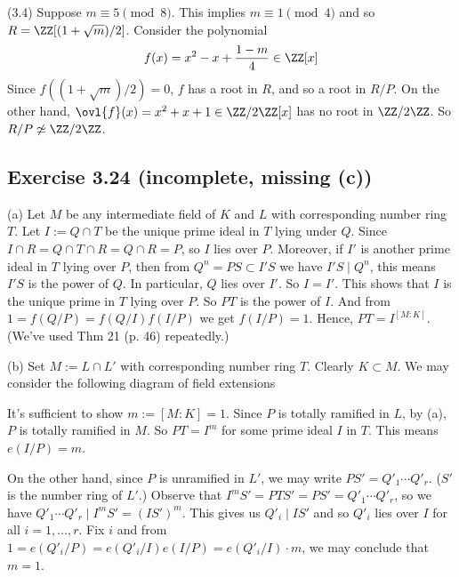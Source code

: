 \documentclass[../Chapter.tex]{subfiles}
\begin{document}
(3.4) Suppose $m\equiv 5\pmod{8}$. This implies $m\equiv 1\pmod{4}$ and so $R=\ZZ[{(1+\sqrt{m})/2}]$. Consider the polynomial $$f(x)=x^2-x+\frac{1-m}{4}\in\ZZ[x]$$ Since $f((1+\sqrt{m})/2)=0$, $f$ has a root in $R$, and so a root in $R/P$. On the other hand, $\ovl{f}(x)=x^2+x+1\in\ZZ/2\ZZ[x]$ has no root in $\ZZ/2\ZZ$. So $R/P\not\simeq\ZZ/2\ZZ$.

\subsection*{Exercise 3.24 \color{red}(incomplete, missing (c))}

(a) Let $M$ be any intermediate field of $K$ and $L$ with corresponding number ring $T$. Let $I:=Q\cap T$ be the unique prime ideal in $T$ lying under $Q$. Since $I\cap R=Q\cap T\cap R=Q\cap R=P$, so $I$ lies over $P$. Moreover, if $I'$ is another prime ideal in $T$ lying over $P$, then from $Q^n=PS\subset I'S$ we have $I'S\mid Q^n$, this means $I'S$ is the power of $Q$. In particular, $Q$ lies over $I'$. So $I=I'$. This shows that $I$ is the unique prime in $T$ lying over $P$. So $PT$ is the power of $I$. And from $1=f(Q/P)=f(Q/I)f(I/P)$ we get $f(I/P)=1$. Hence, $PT=I^{[M:K]}$. (We've used Thm 21 (p. 46) repeatedly.)

(b) Set $M:=L\cap L'$ with corresponding number ring $T$. Clearly $K\subset M$. We may consider the following diagram of field extensions
\begin{center}
\end{center}
It's sufficient to show $m:=[M:K]=1$. Since $P$ is totally ramified in $L$, by (a), $P$ is totally ramified in $M$. So $PT=I^m$ for some prime ideal $I$ in $T$. This means $e(I/P)=m$.

On the other hand, since $P$ is unramified in $L'$, we may write $PS'=Q'_1\cdots Q'_r$. ($S'$ is the number ring of $L'$.) Observe that $I^mS'=PTS'=PS'=Q'_1\cdots Q'_r$, so we have $Q'_1\cdots Q'_r\mid I^mS'=(IS')^m$. This gives us $Q'_i\mid IS'$ and so $Q'_i$ lies over $I$ for all $i=1,\ldots,r$. Fix $i$ and from $1=e(Q'_i/P)=e(Q'_i/I)e(I/P)=e(Q'_i/I)\cdot m$, we may conclude that $m=1$.

\end{document}

